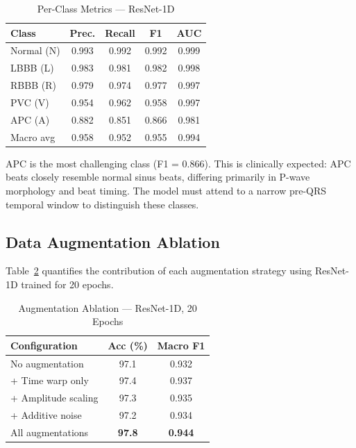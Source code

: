 \documentclass[conference]{IEEEtran}
\begin{document}
\begin{table}[htbp]
\caption{Per-Class Metrics --- ResNet-1D}
\begin{center}
\begin{tabular}{|l|c|c|c|c|}
\hline
\textbf{Class} & \textbf{Prec.} & \textbf{Recall} & \textbf{F1} & \textbf{AUC} \\
\hline
Normal (N)   & 0.993 & 0.992 & 0.992 & 0.999 \\
\hline
LBBB (L)     & 0.983 & 0.981 & 0.982 & 0.998 \\
\hline
RBBB (R)     & 0.979 & 0.974 & 0.977 & 0.997 \\
\hline
PVC (V)      & 0.954 & 0.962 & 0.958 & 0.997 \\
\hline
APC (A)      & 0.882 & 0.851 & 0.866 & 0.981 \\
\hline
Macro avg    & 0.958 & 0.952 & 0.955 & 0.994 \\
\hline
\end{tabular}
\label{tab:perclass}
\end{center}
\end{table}

APC is the most challenging class (F1 = 0.866). This is clinically expected: APC beats closely resemble normal sinus beats, differing primarily in P-wave morphology and beat timing. The model must attend to a narrow pre-QRS temporal window to distinguish these classes.

\subsection{Data Augmentation Ablation}

Table~\ref{tab:ablation} quantifies the contribution of each augmentation strategy using ResNet-1D trained for 20 epochs.

\begin{table}[htbp]
\caption{Augmentation Ablation --- ResNet-1D, 20 Epochs}
\begin{center}
\begin{tabular}{|l|c|c|}
\hline
\textbf{Configuration} & \textbf{Acc (\%)} & \textbf{Macro F1} \\
\hline
No augmentation         & 97.1 & 0.932 \\
\hline
+ Time warp only        & 97.4 & 0.937 \\
\hline
+ Amplitude scaling     & 97.3 & 0.935 \\
\hline
+ Additive noise        & 97.2 & 0.934 \\
\hline
All augmentations       & \textbf{97.8} & \textbf{0.944} \\
\hline
\end{tabular}
\label{tab:ablation}
\end{center}
\end{table}
\end{document}
